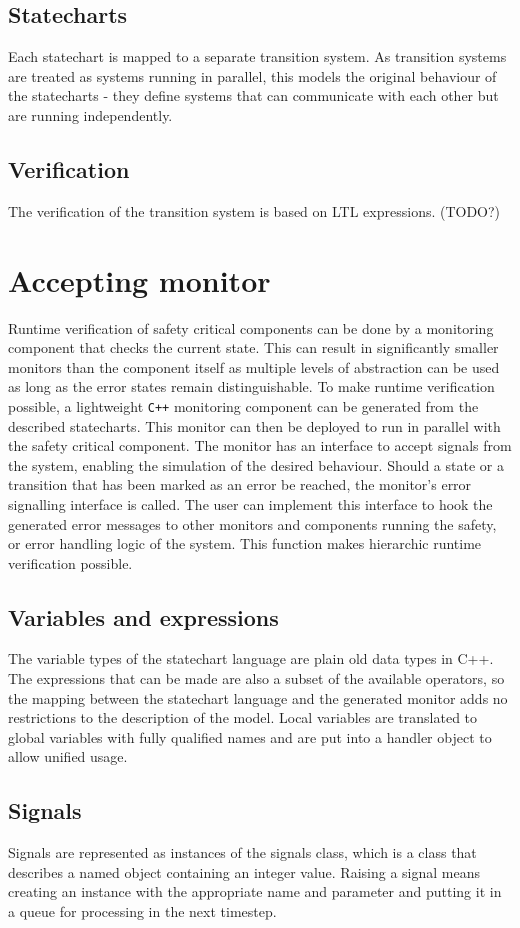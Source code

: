 {  \subsection{Statecharts}
Each statechart is mapped to a separate transition system. As transition systems are treated as systems running in parallel, this models the original behaviour of the statecharts - they define systems that can communicate with each other but are running independently.
  \subsection{Verification}
The verification of the transition system is based on LTL expressions. (TODO?)
\section{Accepting monitor}
Runtime verification of safety critical components can be done by a monitoring component that checks the current state. This can result in significantly smaller monitors than the component itself as multiple levels of abstraction can be used as long as the error states remain distinguishable. To make runtime verification possible, a lightweight \verb!C++! monitoring component can be generated from the described statecharts. This monitor can then be deployed to run in parallel with the safety critical component. The monitor has an interface to accept signals from the system, enabling the simulation of the desired behaviour. Should a state or a transition that has been marked as an error be reached, the monitor's error signalling interface is called. The user can implement this interface to hook the generated error messages to other monitors and components running the safety, or error handling logic of the system. This function makes hierarchic runtime verification possible.
  \subsection{Variables and expressions}
The variable types of the statechart language are plain old data types in C++. The expressions that can be made are also a subset of the available operators, so the mapping between the statechart language and the generated monitor adds no restrictions to the description of the model. Local variables are translated to global variables with fully qualified names and are put into a handler object to allow unified usage.
  \subsection{Signals}
Signals are represented as instances of the signals class, which is a class that describes a named object containing an integer value. Raising a signal means creating an instance with the appropriate name and parameter and putting it in a queue for processing in the next timestep.
}
